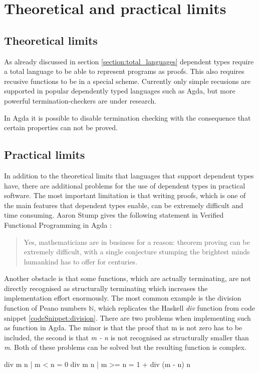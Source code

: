 \section{Theoretical and practical limits}
\subsection{Theoretical limits}
As already discussed in section \ref{section:total_languages} dependent types require a total language to be able to represent programs as proofs.
This also requires recusive functions to be in a special scheme.
Currently only simple recusions are supported in popular dependently typed languages such as Agda, but more powerful termination-checkers are under research.

In Agda it is possible to disable termination checking with the consequence that certain properties can not be proved.
\subsection{Practical limits}
In addition to the theoretical limits that languages that support dependent types have, there are additional problems for the use of dependent types in practical software.
The most important limitation is that writing proofs, which is one of the main features that dependent types enable, can be extremely difficult and time consuming.
Aaron Stump gives the following statement in Verified Functional Programming in Agda \cite{10.1145/2841316}:
\begin{quote}
Yes, mathematicians are in business for a reason: theorem proving can be extremely difficult, with a single conjecture stumping the brightest minds humankind has to offer for centuries.
\end{quote}

Another obstacle is that some functions, which are actually terminating, are not directly recognised as structurally terminating which increases the implementation effort enormously.
The most common example is the division function of Peano numbers $\mathbb{N}$, which replicates the Haskell \emph{div} function from code snippet \ref{codeSnippet:division}.
There are two problems when implementing such as function in Agda. The minor is that the proof that m is not zero has to be included, the second is that \emph{m - n} is not recognised as structurally smaller than \emph{m}. Both of these problems can be solved but the resulting function is complex.
\begin{codesnippet}[mathescape=true, caption={Definition of div function in Haskell}, label={codeSnippet:division}]
div m n | m < n = 0
div m n | m >= n = 1 + div (m - n) n
\end{codesnippet}

